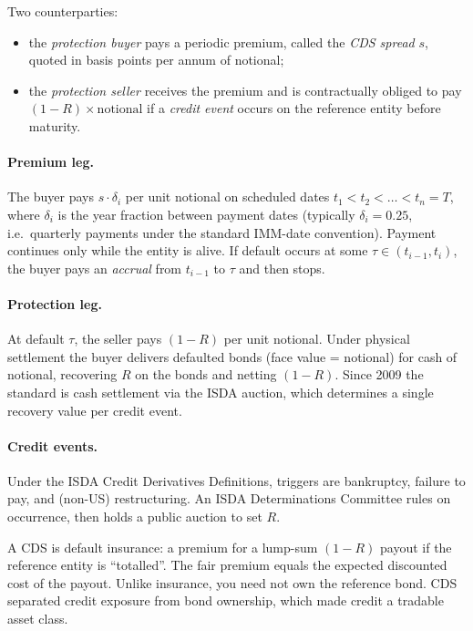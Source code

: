 Two counterparties:
\begin{itemize}
  \item the \emph{protection buyer} pays a periodic premium, called
    the \emph{CDS spread} $s$, quoted in basis points per annum of
    notional;
  \item the \emph{protection seller} receives the premium and is
    contractually obliged to pay
    $(1 - R) \times \mathrm{notional}$ if a \emph{credit event}
    occurs on the reference entity before maturity.
\end{itemize}

\paragraph{Premium leg.}  The buyer pays $s \cdot \delta_i$ per unit
notional on scheduled dates $t_1 < t_2 < \ldots < t_n = T$, where
$\delta_i$ is the year fraction between payment dates (typically
$\delta_i = 0.25$, i.e.\ quarterly payments under the standard
IMM-date convention).  Payment continues only while the entity is
alive.  If default occurs at some $\tau \in (t_{i-1}, t_i)$, the
buyer pays an \emph{accrual} from $t_{i-1}$ to $\tau$ and then
stops.

\paragraph{Protection leg.}  At default $\tau$, the seller pays
$(1-R)$ per unit notional.  Under physical settlement the buyer
delivers defaulted bonds (face value = notional) for cash of
notional, recovering $R$ on the bonds and netting $(1-R)$.  Since
2009 the standard is cash settlement via the ISDA auction, which
determines a single recovery value per credit event.

\paragraph{Credit events.}  Under the ISDA Credit Derivatives
Definitions, triggers are bankruptcy, failure to pay, and (non-US)
restructuring.  An ISDA Determinations Committee rules on
occurrence, then holds a public auction to set $R$.

\begin{intuitionbox}
A CDS is default insurance: a premium for a lump-sum $(1-R)$ payout
if the reference entity is ``totalled''.  The fair premium equals
the expected discounted cost of the payout.  Unlike insurance, you
need not own the reference bond.  CDS separated credit exposure
from bond ownership, which made credit a tradable asset class.
\end{intuitionbox}

